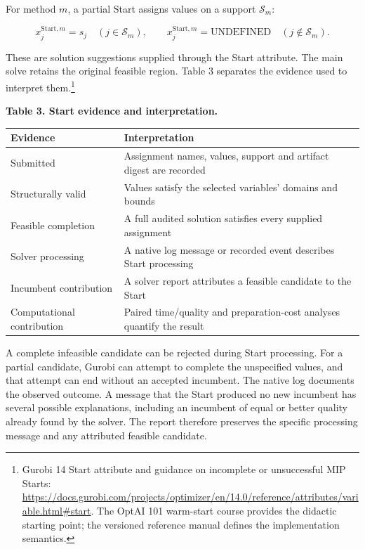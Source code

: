 \documentclass[
  british,
  10pt,
]{article}
\newcounter{none} %
\begin{document}
For method \(m\), a partial Start assigns values on a support
\(\mathcal S_m\):

\[
x_j^{\mathrm{Start},m}=s_j\quad(j\in\mathcal S_m),
\qquad x_j^{\mathrm{Start},m}=\mathrm{UNDEFINED}\quad(j\notin\mathcal S_m).
\tag{2}
\]

These are solution suggestions supplied through the Start attribute. The
main solve retains the original feasible region. Table 3 separates the
evidence used to interpret them.\footnote{Gurobi 14 Start attribute and
  guidance on incomplete or unsuccessful MIP Starts:
  \url{https://docs.gurobi.com/projects/optimizer/en/14.0/reference/attributes/variable.html\#start}.
  The OptAI 101 warm-start course provides the didactic starting point;
  the versioned reference manual defines the implementation semantics.}


\textbf{Table 3. Start evidence and interpretation.}

{\def\LTcaptype{none} %
\begin{longtable}[]{@{}
  >{\raggedright\arraybackslash}p{}
  >{\raggedright\arraybackslash}p{}@{}}
\toprule\noalign{}
\begin{minipage}[b]{\linewidth}\raggedright
Evidence
\end{minipage} & \begin{minipage}[b]{\linewidth}\raggedright
Interpretation
\end{minipage} \\
\midrule\noalign{}
\endhead
\bottomrule\noalign{}
\endlastfoot
Submitted & Assignment names, values, support and artifact digest are
recorded \\
Structurally valid & Values satisfy the selected variables' domains and
bounds \\
Feasible completion & A full audited solution satisfies every supplied
assignment \\
Solver processing & A native log message or recorded event describes
Start processing \\
Incumbent contribution & A solver report attributes a feasible candidate
to the Start \\
Computational contribution & Paired time/quality and preparation-cost
analyses quantify the result \\
\end{longtable}
}

A complete infeasible candidate can be rejected during Start processing.
For a partial candidate, Gurobi can attempt to complete the unspecified
values, and that attempt can end without an accepted incumbent. The
native log documents the observed outcome. A message that the Start
produced no new incumbent has several possible explanations, including
an incumbent of equal or better quality already found by the solver. The
report therefore preserves the specific processing message and any
attributed feasible candidate.
\end{document}
